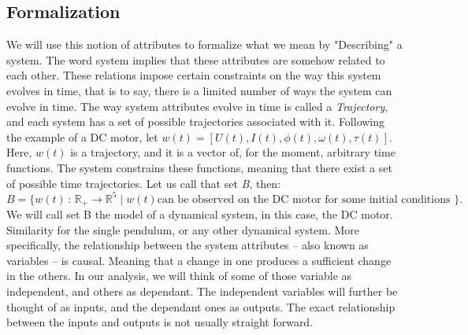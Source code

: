 \subsection{Formalization}
We will use this notion of attributes to formalize what we mean by "Describing" a system. The word system implies that these attributes are somehow related to each other. These relations impose certain constraints on the way this system evolves in time, that is to say, there is a limited number of ways the system can evolve
in time. The way system attributes evolve in time is called a \textit{Trajectory}, and each system has a set of possible trajectories associated with it.
{
Following the example of a DC motor, let $w(t) = [U(t), I(t), \phi(t), \omega(t), \tau(t)]$.  Here, $w(t)$ is a trajectory, and it is a vector of, for the moment, arbitrary time functions. The system constrains these functions, meaning that there exist a set of possible time trajectories. Let us call that set  \textit{B}, then:
    \begin{equation}
        B =\{w(t)\,:\,\mathbb{R}_+ \longrightarrow \mathbb{R}^5 \mid w(t)  \text{can be observed on the DC motor for some initial conditions }\}.
    \end{equation}
We will call set B the model of a dynamical system, in this case, the DC motor.
Similarity for the single pendulum, or any other dynamical system.
}
More specifically, the relationship between the system attributes -- also known as variables -- is causal. Meaning that a change in one produces a sufficient change in the others. In our analysis, we will think of some of those variable as independent, and others as dependant. The independent variables will further be thought of as inputs, and the dependant ones as outputs. The exact relationship between the inputs and outputs is not usually straight forward.

